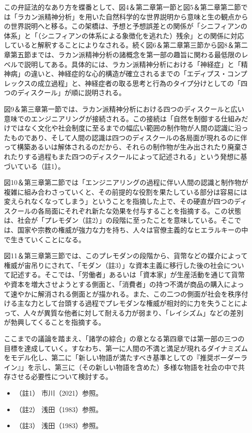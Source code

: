 この\mbox{弁証法}的なあり方を蝶番として、図4＆第二章第一節と図5＆第二章第二節では「ラカン派精神分析」を用いた自然科学的な世界説明から意味と生の観点からの世界説明へと移る。この架橋は、予想と予想誤差との関係が「シニフィアンの体系」と「（シニフィアンの体系による象徴化を逃れた）残余」との関係に対応していると解釈することによりなされる。続く図6＆第二章第三節から図8＆第二章第五節までは、ラカン派精神分析の諸概念を第一部の趣旨に関わる最低限のレベルで説明してある。具体的には、ラカン派精神分析における「神経症」と「精神病」の違いと、神経症的な心的構造が確立されるまでの「エディプス・コンプレックスの成立過程」と、神経症者の取る思考と行為のタイプ分けとしての「四つのディスクール」が順に説明される。

図9＆第三章第一節では、ラカン派精神分析における四つのディスクールと広い意味でのエンジニアリングが接続される。この接続は「自然を制御する仕組みだけではなく文化や社会制度に至るまでの幅広い範囲の制作物が人間の認識に沿ったものであり、そして人間の認識は四つのディスクールの各局面が現れるのに伴って構築あるいは解体されるのだから、それらの制作物が生み出されたり廃棄されたりする過程もまた四つのディスクールによって記述される」という発想に基づいている（註1）。

図10＆第三章第二節では「エンジニアリングの過程に伴い人間の認識と制作物が複雑に組み合わさっていくと、その前提的な役割を果たしている部分は容易には変えられなくなってしまう」ということを指摘した上で、その硬直が四つのディスクールの各局面にそれぞれ新たな効果を付与することを指摘する。この状態は、社会が「プレモダン（註2）」の段階に至ったことを意味している。そこでは、国家や宗教の権威が強力な力を持ち、人々は官僚主義的なヒエラルキーの中で生きていくことになる。

図11＆第三章第三節では、このプレモダンの段階から、貨幣などの媒介によって権威が宙吊りにされて、「モダン（註3）」な資本主義に移行した後の社会について記述する。そこでは、「労働者」あるいは「資本家」が生産活動を通じて貨幣や資本を増大させようとする側面と、「消費者」の持つ不満が商品の購入によって速やかに解消される側面とが描かれる。また、この二つの側面が社会を秩序付ける主な力として台頭する過程でプレモダンな権威が相対的に力を失うことによって、人々が異質な他者に対して耐える力が弱まり、「レイシズム」などの差別が勃興してくることを指摘する。

ここまでの議論を踏まえ、「諸学の綜合」の章となる第四章では第一部の三つの目標を達成していく。すなわち、第一に人間の不満と満足が現れるダイナミズムをモデル化し、第二に「新しい物語が満たすべき基準としての『推奨ボーダーライン』」を示し、第三に（その新しい物語を含めた）多様な物語を社会の中で共存させる必要性について検討する。

\begin{itemize}
\tightlist
\item
  （註1） 市川（2021）\cite{Ichikawa}参照。
\item
  （註2） 浅田（1983）\cite{Asada}参照。
\item
  （註3） 浅田（1983）\cite{Asada}参照。
\end{itemize}
